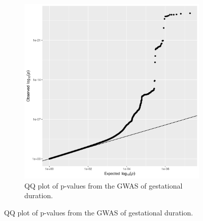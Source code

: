 \begin{figure}
  \centering
  \begin{subfigure}[t]{\textwidth}
    \centering
    \includegraphics[width=\linewidth]{img/FigureS_qq_plot.png}
    \caption{QQ plot of p-values from the GWAS of gestational duration.}\label{fig:qqplot}
  \end{subfigure}
\end{figure}


